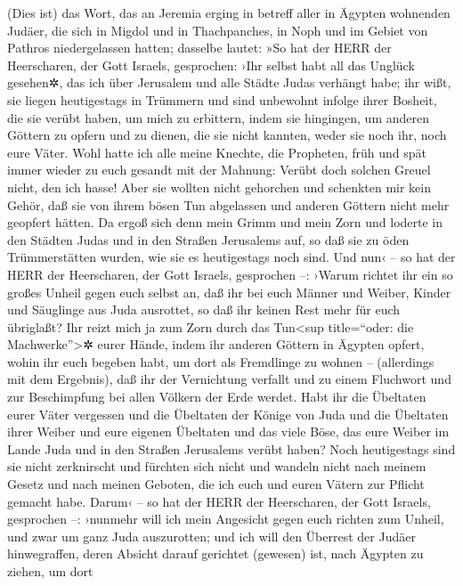 (Dies ist) das Wort, das an Jeremia erging in betreff
aller in Ägypten wohnenden Judäer, die sich in Migdol und in
Thachpanches, in Noph und im Gebiet von Pathros niedergelassen hatten;
dasselbe lautet: »So hat der HERR der Heerscharen, der
Gott Israels, gesprochen: ›Ihr selbst habt all das Unglück gesehen✲, das
ich über Jerusalem und alle Städte Judas verhängt habe; ihr wißt, sie
liegen heutigestags in Trümmern und sind unbewohnt infolge
ihrer Bosheit, die sie verübt haben, um mich zu erbittern, indem sie
hingingen, um anderen Göttern zu opfern und zu dienen, die sie nicht
kannten, weder sie noch ihr, noch eure Väter. Wohl hatte
ich alle meine Knechte, die Propheten, früh und spät immer wieder zu
euch gesandt mit der Mahnung: Verübt doch solchen Greuel nicht, den ich
hasse! Aber sie wollten nicht gehorchen und schenkten mir
kein Gehör, daß sie von ihrem bösen Tun abgelassen und anderen Göttern
nicht mehr geopfert hätten. Da ergoß sich denn mein Grimm
und mein Zorn und loderte in den Städten Judas und in den Straßen
Jerusalems auf, so daß sie zu öden Trümmerstätten wurden, wie sie es
heutigestags noch sind. Und nun‹ -- so hat der HERR der
Heerscharen, der Gott Israels, gesprochen --: ›Warum richtet ihr ein so
großes Unheil gegen euch selbst an, daß ihr bei euch Männer und Weiber,
Kinder und Säuglinge aus Juda ausrottet, so daß ihr keinen Rest mehr für
euch übriglaßt? Ihr reizt mich ja zum Zorn durch das
Tun\textless sup title=``oder: die Machwerke''\textgreater✲ eurer Hände,
indem ihr anderen Göttern in Ägypten opfert, wohin ihr euch begeben
habt, um dort als Fremdlinge zu wohnen -- (allerdings mit dem Ergebnis),
daß ihr der Vernichtung verfallt und zu einem Fluchwort und zur
Beschimpfung bei allen Völkern der Erde werdet. Habt ihr
die Übeltaten eurer Väter vergessen und die Übeltaten der Könige von
Juda und die Übeltaten ihrer Weiber und eure eigenen Übeltaten und das
viele Böse, das eure Weiber im Lande Juda und in den Straßen Jerusalems
verübt haben? Noch heutigestags sind sie nicht
zerknirscht und fürchten sich nicht und wandeln nicht nach meinem Gesetz
und nach meinen Geboten, die ich euch und euren Vätern zur Pflicht
gemacht habe. Darum‹ -- so hat der HERR der Heerscharen,
der Gott Israels, gesprochen --: ›nunmehr will ich mein Angesicht gegen
euch richten zum Unheil, und zwar um ganz Juda auszurotten;
und ich will den Überrest der Judäer hinwegraffen, deren
Absicht darauf gerichtet (gewesen) ist, nach Ägypten zu ziehen, um dort
